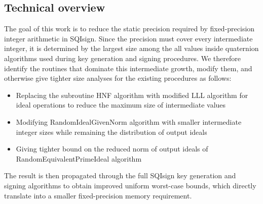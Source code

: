 



\subsection{Technical overview}
\label{subsec:technical-overview}

The goal of this work is to reduce the static precision required by fixed-precision integer arithmetic in SQIsign.
Since the precision must cover every intermediate integer, it is determined by the largest size among the all values inside quaternion algorithms used during key generation and signing procedures.
We therefore identify the routines that dominate this intermediate growth, modify them, and otherwise give tighter size analyses for the existing procedures as follows:
\begin{itemize}
    \item Replacing the subroutine HNF algorithm with modified LLL algorithm for ideal operations to reduce the maximum size of intermediate values
    \item Modifying \textsf{RandomIdealGivenNorm} algorithm with smaller intermediate integer sizes while remaining the distribution of output ideals
    \item Giving tighter bound on the reduced norm of output ideals of \textsf{RandomEquivalentPrimeIdeal} algorithm
\end{itemize}
The result is then propagated through the full SQIsign key generation and signing algorithms to obtain improved uniform worst-case bounds, which directly translate into a smaller fixed-precision memory requirement.

